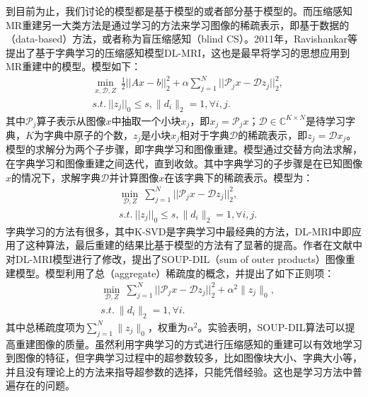 到目前为止，我们讨论的模型都是基于模型的或者部分基于模型的。而压缩感知MR重建另一大类方法是通过学习的方法来学习图像的稀疏表示，即基于数据的（data-based）方法，或者称为盲压缩感知\cite{gleichman2011blind}（blind CS）。2011年，Ravishankar等提出了基于字典学习的压缩感知模型DL-MRI\cite{dlmri}，这也是最早将学习的思想应用到MR重建中的模型。模型如下：
\begin{equation}
\begin{aligned}
	& \min_{x,\mathcal{D},Z}\ \frac{1}{2}||Ax-b||_2^2+\alpha\sum_{j=1}^N||\mathcal{P}_{j}x-\mathcal{D}z_j||_2^2,\\
	&s.t.\ ||z_j||_0\leq s, \|d_i\|_2=1, \forall i,j.
\end{aligned}
\end{equation}
其中$\mathcal{P}_j$算子表示从图像$x$中抽取一个小块$x_j$，即$x_j=\mathcal{P}_jx$；$\mathcal{D}\in \mathbb{C}^{K\times N}$是待学习字典，$K$为字典中原子的个数，$z_j$是小块$x_j$相对于字典$\mathcal{D}$的稀疏表示，即$z_j=\mathcal{D}x_j$。模型的求解分为两个子步骤，即字典学习和图像重建。模型通过交替方向法求解，在字典学习和图像重建之间迭代，直到收敛。其中字典学习的子步骤是在已知图像$x$的情况下，求解字典$\mathcal{D}$并计算图像$x$在该字典下的稀疏表示。模型为：
\begin{equation}
\begin{aligned}
	& \min_{\mathcal{D},Z}\ \sum_{j=1}^N||\mathcal{P}_{j}x-\mathcal{D}z_j||_2^2,\\
	&s.t.\ ||z_j||_0\leq s, \|d_i\|_2=1, \forall i,j.
\end{aligned}
\label{equ:dictlearning}
\end{equation}
字典学习的方法有很多\cite{ksvd,mairal2010online,rubinstein2009double}，其中K-SVD\cite{ksvd}是字典学习中最经典的方法，DL-MRI中即应用了这种算法，最后重建的结果比基于模型的方法有了显著的提高。作者在文献\cite{ravishankar2017efficient}中对DL-MRI模型进行了修改，提出了SOUP-DIL（sum of outer products）图像重建模型。模型利用了总（aggregate）稀疏度的概念，并提出了如下正则项：
\begin{equation}
\begin{aligned}
	& \min_{\mathcal{D},Z}\ \sum_{j=1}^N||\mathcal{P}_{j}x-\mathcal{D}z_j||_2^2 + \alpha^2\|z_j\|_0,\\
	&s.t.\ \|d_i\|_2=1, \forall i.
\end{aligned}
\label{equ:soup}
\end{equation}
其中总稀疏度项为$\sum_{j=1}^N\|z_j\|_0$，权重为$\alpha^2$。实验表明，SOUP-DIL算法可以提高重建图像的质量。虽然利用字典学习的方式进行压缩感知的重建可以有效地学习到图像的特征，但字典学习过程中的超参数较多，比如图像块大小、字典大小等，并且没有理论上的方法来指导超参数的选择，只能凭借经验。这也是学习方法中普遍存在的问题。

